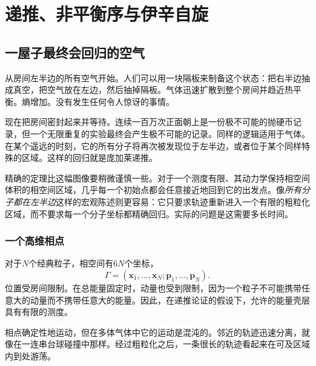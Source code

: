 \chapter{递推、非平衡序与伊辛自旋}


\section{一屋子最终会回归的空气}

从房间左半边的所有空气开始。人们可以用一块隔板来制备这个状态：把右半边抽成真空，把空气放在左边，然后抽掉隔板。气体迅速扩散到整个房间并趋近热平衡。熵增加。没有发生任何令人惊讶的事情。

现在把房间密封起来并等待。连续一百万次正面朝上是一份极不可能的抛硬币记录，但一个无限重复的实验最终会产生极不可能的记录。同样的逻辑适用于气体。在某个遥远的时刻，它的所有分子将再次被发现位于左半边，或者位于某个同样特殊的区域。这样的回归就是庞加莱递推。

精确的定理比这幅图像要稍微谨慎一些。对于一个测度有限、其动力学保持相空间体积的相空间区域，几乎每一个初始点都会任意接近地回到它的出发点。像\emph{所有分子都在左半边}这样的宏观陈述则更容易：它只要求轨迹重新进入一个有限的粗粒化区域，而不要求每一个分子坐标都精确回归。实际的问题是这需要多长时间。

\subsection{一个高维相点}

对于\(N\)个经典粒子，相空间有\(6N\)个坐标，\begin{equation}
 \Gamma=(\bm x_1,\ldots,\bm x_N;\bm p_1,\ldots,\bm p_N).
 \label{eq:sm8-phase-point}
\end{equation}
位置受房间限制。在总能量固定时，动量也受到限制，因为一个粒子不可能携带任意大的动量而不携带任意大的能量。因此，在递推论证的假设下，允许的能量壳层具有有限的测度。

相点确定性地运动，但在多体气体中它的运动是混沌的。邻近的轨迹迅速分离，就像在一连串台球碰撞中那样。经过粗粒化之后，一条很长的轨迹看起来在可及区域内到处游荡。

